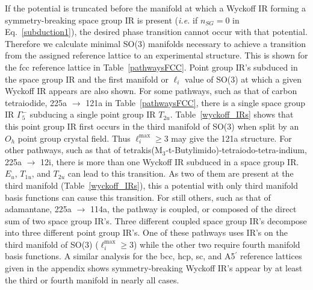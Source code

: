 \documentclass[preprint]{iucr}              %
\begin{document}
If the potential is truncated before the manifold at which a Wyckoff
IR forming a symmetry-breaking space group IR is present
(\emph{i.e.} if $n_{SG}=0$ in Eq.\ \ref{subduction1}), the desired
phase transition cannot occur with that potential. Therefore we
calculate minimal SO(3) manifolds necessary to achieve a transition
from the assigned reference lattice to an experimental structure.
This is shown for the fcc reference lattice in Table~\ref{pathwaysFCC}.  Point group IR's subduced
in the space group IR and the first
manifold or $\ell_i$ value of SO(3) at which a given Wyckoff IR
appears are also shown. For some pathways, such as that of carbon tetraiodide, 225a
$\rightarrow$ 121a in Table~\ref{pathwaysFCC}, there is a single
space group IR $\Gamma_5^-$ subducing a single point group IR
$T_{2u}$. Table~\ref{wyckoff_IRs} shows that this point group IR
first occurs in the third manifold of SO(3) when split by an $O_h$
point group crystal field.  Thus $\ell_i^{\mathrm{max}}\geq 3$ may
give the 121a structure. For other pathways, such as that of tetrakis(M$_3$-t-Butylimido)-tetraiodo-tetra-indium, 225a
$\rightarrow$ 12i, there is more than
one Wyckoff IR subduced in a space group IR. $E_u$, $T_{1u}$, and
$T_{2u}$ can lead to this transition. As two of them are present at the
third manifold (Table~\ref{wyckoff_IRs}), this a potential with only third manifold basis functions
can cause this transition. For still others, such as that of adamantane,
225a $\rightarrow$ 114a, the pathway is
coupled, or composed of the direct sum of two space group IR's.
Three different coupled space group IR's decompose into three
different point group IR's. One of these pathways uses IR's on the
third manifold of SO(3) ($\ell^{\mathrm{max}}_i\geq 3$) while the
other two require fourth manifold basis functions. A similar analysis
for the bcc, hcp, sc, and A5$^\prime$ reference
lattices given in the appendix shows symmetry-breaking
Wyckoff IR's appear by at least the third or fourth manifold in
nearly all cases.
\end{document}
